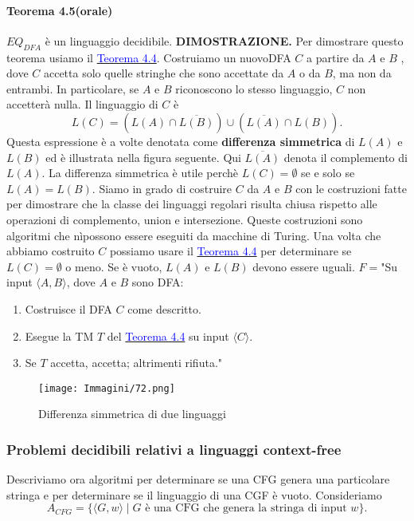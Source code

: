 \documentclass{article}
\begin{document}
\paragraph{Teorema 4.5(orale)}
\label{teorema-4.5}
$EQ_{DFA}$ è un linguaggio decidibile.
\vspace{1em}
\text{}
\newline
\hbox{\textbf{DIMOSTRAZIONE.}}
Per dimostrare questo teorema usiamo il \hyperref[teorema-4.4]{\textcolor{blue}{Teorema 4.4}}.
Costruiamo un nuovoDFA $C$ a partire da $A$ e $B$ , dove $C$ accetta solo quelle stringhe che sono accettate da $A$ o da $B$, ma non da entrambi.
In particolare, se $A$ e $B$ riconoscono lo stesso linguaggio, $C$ non accetterà nulla.
Il linguaggio di $C$ è
$$
L(C) = (L(A) \cap \overline{L(B)}) \cup (\overline{L(A)} \cap L(B)).
$$
Questa espressione è a volte denotata come \textbf{differenza simmetrica} di $L(A)$ e $L(B)$ ed è illustrata nella figura seguente.
Qui $\overline{L(A)}$ denota il complemento di $L(A)$.
La differenza simmetrica è utile perchè $L(C) = \emptyset$ se e solo se $L(A) = L(B)$.
Siamo in grado di costruire $C$ da $A$ e $B$ con le costruzioni fatte per dimostrare che la classe dei linguaggi regolari risulta chiusa rispetto alle operazioni di complemento, union e intersezione.
Queste costruzioni sono algoritmi che nìpossono essere eseguiti da macchine di Turing.
Una volta che abbiamo costruito $C$ possiamo usare il \hyperref[teorema-4.4]{\textcolor{blue}{Teorema 4.4}} per determinare se $L(C) = \emptyset$ o meno.
Se è vuoto, $L(A)$ e $L(B)$ devono essere uguali.
\vspace{1em}
\text{}
\newline
$F = $"Su input $\langle A,B \rangle$, dove $A$ e $B$ sono DFA:
\begin{enumerate}
    \item Costruisce il DFA $C$ come descritto.
    \item Esegue la TM $T$ del \hyperref[teorema-4.4]{\textcolor{blue}{Teorema 4.4}} su input $\langle C \rangle$.
    \item Se $T$ accetta, accetta; altrimenti rifiuta."
\end{enumerate}

\begin{figure}[H]
    \centering
    \texttt{[image: Immagini/72.png]}
    \caption{Differenza simmetrica di due linguaggi}
    \label{figura-4.6}
\end{figure}

\subsubsection{Problemi decidibili relativi a linguaggi context-free}
Descriviamo ora algoritmi per determinare se una CFG genera una particolare stringa e per determinare se il linguaggio di una CGF è vuoto.
\newline
Consideriamo
$$
A_{CFG} = \{\langle G,w \rangle \mid G \text{ è una CFG che genera la stringa di input } w \}.
$$
\end{document}

